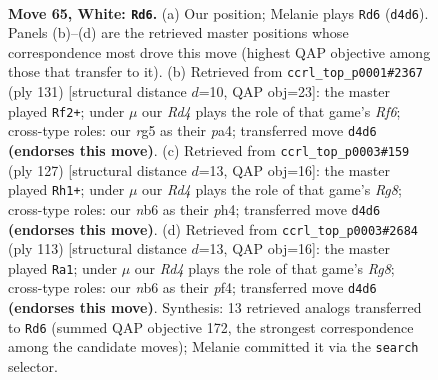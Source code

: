 \documentclass[11pt]{article}
\begin{document}
\clearpage

\begin{figure}[p]\centering
\begin{subfigure}{0.46\textwidth}\centering
\resizebox{\linewidth}{!}{%
\newchessgame
\chessboard[
  setfen={4k3/8/1n6/6rp/p2R4/P7/7K/8 w - - 7 65},
  showmover=false,
  pgfstyle=straightmove, color=movearrow, markmove={d4-d6}
]}
\caption{}
\end{subfigure}\hfill
\begin{subfigure}{0.46\textwidth}\centering
\resizebox{\linewidth}{!}{%
\newchessgame
\chessboard[
  setfen={8/8/8/3Np1k1/P3P3/2P2r2/7K/8 b - - 0 66},
  showmover=false,
  pgfstyle=straightmove, color=movearrow, markmove={f3-f2}
]}
\caption{}
\end{subfigure}
\\[4pt]
\begin{subfigure}{0.46\textwidth}\centering
\resizebox{\linewidth}{!}{%
\newchessgame
\chessboard[
  setfen={5k2/3R4/6p1/6P1/7P/7K/8/6r1 b - - 18 64},
  showmover=false,
  pgfstyle=straightmove, color=movearrow, markmove={g1-h1}
]}
\caption{}
\end{subfigure}\hfill
\begin{subfigure}{0.46\textwidth}\centering
\resizebox{\linewidth}{!}{%
\newchessgame
\chessboard[
  setfen={8/4k3/6p1/6P1/2R2P2/5K2/8/6r1 b - - 26 57},
  showmover=false,
  pgfstyle=straightmove, color=movearrow, markmove={g1-a1}
]}
\caption{}
\end{subfigure}
\caption{\textbf{Move 65, White: \texttt{Rd6}.} (a) Our position; Melanie plays \texttt{Rd6} (\texttt{d4d6}). Panels (b)--(d) are the retrieved master positions whose correspondence most drove this move (highest QAP objective among those that transfer to it). (b) Retrieved from \texttt{ccrl\_top\_p0001\#2367} (ply 131) [structural distance $d$=10, QAP obj=23]: the master played \texttt{Rf2+}; under $\mu$ our \emph{Rd4} plays the role of that game's \emph{Rf6}; cross-type roles: our \emph{r}g5 as their \emph{p}a4; transferred move \texttt{d4d6} \textbf{(endorses this move)}. (c) Retrieved from \texttt{ccrl\_top\_p0003\#159} (ply 127) [structural distance $d$=13, QAP obj=16]: the master played \texttt{Rh1+}; under $\mu$ our \emph{Rd4} plays the role of that game's \emph{Rg8}; cross-type roles: our \emph{n}b6 as their \emph{p}h4; transferred move \texttt{d4d6} \textbf{(endorses this move)}. (d) Retrieved from \texttt{ccrl\_top\_p0003\#2684} (ply 113) [structural distance $d$=13, QAP obj=16]: the master played \texttt{Ra1}; under $\mu$ our \emph{Rd4} plays the role of that game's \emph{Rg8}; cross-type roles: our \emph{n}b6 as their \emph{p}f4; transferred move \texttt{d4d6} \textbf{(endorses this move)}. Synthesis: 13 retrieved analogs transferred to \texttt{Rd6} (summed QAP objective 172, the strongest correspondence among the candidate moves); Melanie committed it via the \texttt{search} selector.}
\label{fig:thought-m128}
\end{figure}
\end{document}
